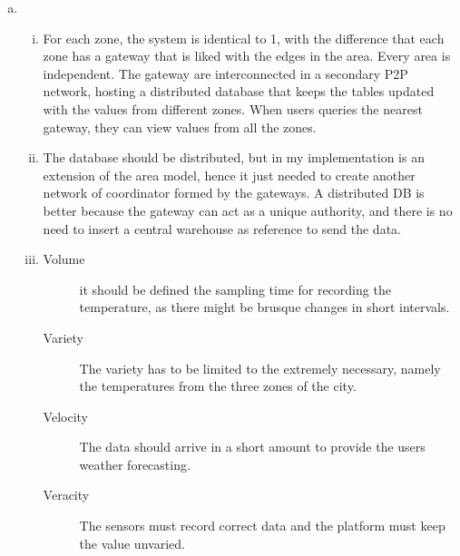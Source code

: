 \documentclass[a4paper, 12pt]{article}
\begin{document}
\begin{exercise}
\begin{enumerate}[(a)]
\begin{enumerate}[i.]
		\end{enumerate}
	\item 
		\begin{enumerate}[(i)]
		\begin{figure}
			\centering
			\def\svgwidth{\linewidth}
			 
			\caption{Temperature monitoring, three zones}
			\label{fig:inkscape_figure}
		\end{figure}
		    \item For each zone, the system is identical to 1, with the
				difference that each zone has a gateway that is liked with the
				edges in the area. Every area is independent. The gateway are
				interconnected in a secondary P2P network, hosting a distributed
				database that keeps the tables
				updated with the values from different zones. When users queries
				the nearest gateway, they can view values from all the zones. 
			\item The database should be distributed, but in my implementation
				is an extension of the area model, hence it just needed to
				create another network of coordinator formed by the gateways.
				A distributed DB is better because the gateway can act as a
				unique authority, and there is no need to insert a central warehouse as
				reference to send the data.
			\item 
				\begin{description}
				    \item[Volume] it should be defined the sampling time for
						recording the temperature, as there might be brusque
						changes in short intervals.
					\item[Variety] The variety has to be limited to the
						extremely necessary, namely the temperatures from the
						three zones of the city.
					\item[Velocity] The data should arrive in a short amount to
						provide the users weather forecasting.
					\item[Veracity] The sensors must record correct data and
						the platform must keep the value unvaried.  
				\end{description}
		\end{enumerate}
\end{enumerate}
\end{exercise}


\medskip

\printbibliography

\doclicenseThis
\end{document}
